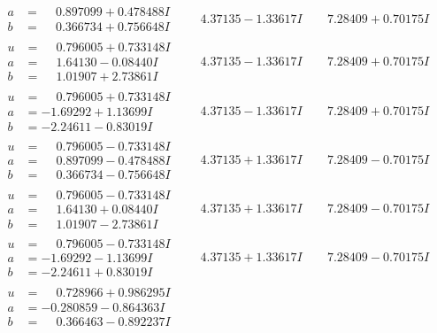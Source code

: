 \documentclass[1p]{elsarticle_modified}
\theoremstyle{definition}
\begin{document}
$$\begin{array}{c|c|c}
\begin{aligned}
a &= \phantom{-}0.897099 + 0.478488 I \\
b &= \phantom{-}0.366734 + 0.756648 I\end{aligned}
 & \phantom{-}4.37135 - 1.33617 I & \phantom{-}7.28409 + 0.70175 I \\ \hline\begin{aligned}
u &= \phantom{-}0.796005 + 0.733148 I \\
a &= \phantom{-}1.64130 - 0.08440 I \\
b &= \phantom{-}1.01907 + 2.73861 I\end{aligned}
 & \phantom{-}4.37135 - 1.33617 I & \phantom{-}7.28409 + 0.70175 I \\ \hline\begin{aligned}
u &= \phantom{-}0.796005 + 0.733148 I \\
a &= -1.69292 + 1.13699 I \\
b &= -2.24611 - 0.83019 I\end{aligned}
 & \phantom{-}4.37135 - 1.33617 I & \phantom{-}7.28409 + 0.70175 I \\ \hline\begin{aligned}
u &= \phantom{-}0.796005 - 0.733148 I \\
a &= \phantom{-}0.897099 - 0.478488 I \\
b &= \phantom{-}0.366734 - 0.756648 I\end{aligned}
 & \phantom{-}4.37135 + 1.33617 I & \phantom{-}7.28409 - 0.70175 I \\ \hline\begin{aligned}
u &= \phantom{-}0.796005 - 0.733148 I \\
a &= \phantom{-}1.64130 + 0.08440 I \\
b &= \phantom{-}1.01907 - 2.73861 I\end{aligned}
 & \phantom{-}4.37135 + 1.33617 I & \phantom{-}7.28409 - 0.70175 I \\ \hline\begin{aligned}
u &= \phantom{-}0.796005 - 0.733148 I \\
a &= -1.69292 - 1.13699 I \\
b &= -2.24611 + 0.83019 I\end{aligned}
 & \phantom{-}4.37135 + 1.33617 I & \phantom{-}7.28409 - 0.70175 I \\ \hline\begin{aligned}
u &= \phantom{-}0.728966 + 0.986295 I \\
a &= -0.280859 - 0.864363 I \\
b &= \phantom{-}0.366463 - 0.892237 I\end{aligned}

\end{array}$$
\end{document}
